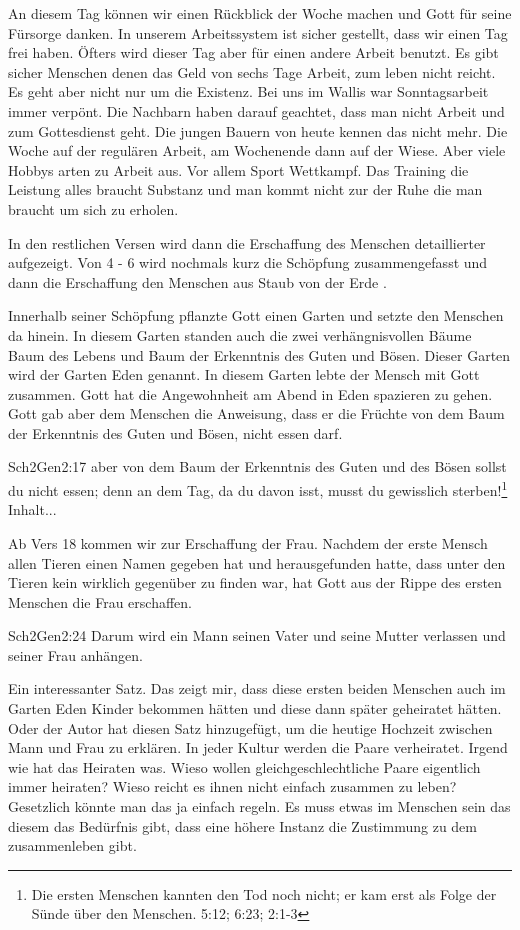 An diesem Tag können wir einen Rückblick der Woche machen und Gott für seine Fürsorge danken. In unserem Arbeitssystem ist sicher gestellt, dass wir einen Tag frei haben. Öfters wird dieser Tag aber für einen andere Arbeit benutzt. Es gibt sicher Menschen denen das Geld von sechs Tage Arbeit, zum leben nicht reicht. Es geht aber nicht nur um die Existenz. Bei uns im Wallis war Sonntagsarbeit immer verpönt. Die Nachbarn haben darauf geachtet, dass man nicht Arbeit und zum Gottesdienst geht. Die jungen Bauern von heute kennen das nicht mehr. Die Woche auf der regulären Arbeit, am Wochenende dann auf der Wiese. Aber viele Hobbys arten zu Arbeit aus. Vor allem Sport Wettkampf. Das Training die Leistung alles braucht Substanz und man kommt nicht zur der Ruhe die man braucht um sich zu erholen.

In den restlichen Versen wird dann die Erschaffung des Menschen detaillierter aufgezeigt. Von 4 - 6 wird nochmals kurz die Schöpfung zusammengefasst und dann die Erschaffung den Menschen aus \flqq Staub von der Erde \frqq{}. 

Innerhalb seiner Schöpfung pflanzte Gott einen Garten und setzte den Menschen da hinein. In diesem Garten standen auch die zwei verhängnisvollen Bäume \flqq Baum des Lebens\frqq{} und \flqq Baum der Erkenntnis des Guten und Bösen\frqq{}. Dieser Garten wird der Garten Eden genannt. In diesem Garten lebte der Mensch mit Gott zusammen. Gott hat die Angewohnheit am Abend in Eden spazieren zu gehen. Gott gab aber dem Menschen die Anweisung, dass er die Früchte von dem \flqq Baum der Erkenntnis des Guten und Bösen\flqq{}, nicht essen darf.
\begin{bibeltext}{Sch2}{Gen}{2:17}
	aber von dem Baum der Erkenntnis des Guten und des Bösen sollst du nicht essen; denn an dem Tag, da du davon isst, musst du gewisslich sterben!\footnote{Die ersten Menschen kannten den Tod noch nicht; er kam erst als Folge der Sünde über den Menschen.  {5:12};  {6:23};  {2:1-3}}
	Inhalt...
\end{bibeltext}
Ab Vers 18 kommen wir zur Erschaffung der Frau. Nachdem der erste Mensch allen Tieren einen Namen gegeben hat und herausgefunden hatte, dass unter den Tieren kein wirklich gegenüber zu finden war, hat Gott aus der Rippe des ersten Menschen die Frau erschaffen. 
\begin{bibeltext}{Sch2}{Gen}{2:24}
	Darum wird ein Mann seinen Vater und seine Mutter verlassen und seiner Frau anhängen.	
\end{bibeltext}
Ein interessanter Satz. Das zeigt mir, dass diese ersten beiden Menschen auch im Garten Eden Kinder bekommen hätten und diese dann später geheiratet hätten. Oder der Autor hat diesen Satz hinzugefügt, um die heutige Hochzeit zwischen Mann und Frau zu erklären. In jeder Kultur werden die Paare verheiratet. Irgend wie hat das Heiraten was. Wieso wollen gleichgeschlechtliche Paare eigentlich immer heiraten? Wieso reicht es ihnen nicht einfach zusammen zu leben? Gesetzlich könnte man das ja einfach regeln. Es muss etwas im Menschen sein das diesem das Bedürfnis gibt, dass eine höhere Instanz die Zustimmung zu dem zusammenleben gibt.


